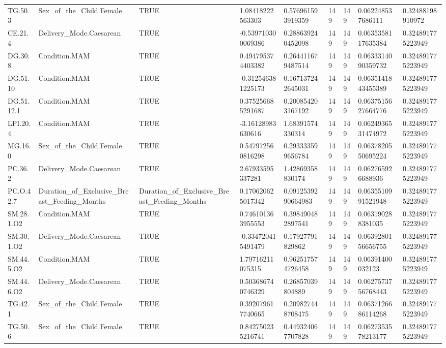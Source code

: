 \begin{longtable}{lllllllll}
TG.50.3 & Sex\_of\_the\_Child.Female & TRUE & 1.08418222563303 & 0.576961593919359 & 149 & 149 & 0.062248537686111 & 0.32488198910972 \\
CE.21.4 & Delivery\_Mode.Caesarean & TRUE & -0.539710300069386 & 0.288639240452098 & 149 & 149 & 0.0635358117635384 & 0.324891775223949 \\
DG.30.8 & Condition.MAM & TRUE & 0.494795374403382 & 0.264411679487514 & 149 & 149 & 0.0633314090359732 & 0.324891775223949 \\
DG.51.10 & Condition.MAM & TRUE & -0.312546381225173 & 0.167137242645031 & 149 & 149 & 0.0635141843455389 & 0.324891775223949 \\
DG.51.12.1 & Condition.MAM & TRUE & 0.375256685291687 & 0.200854203167192 & 149 & 149 & 0.0637515627664776 & 0.324891775223949 \\
LPI.20.4 & Condition.MAM & TRUE & -3.16128983630616 & 1.68391574330314 & 149 & 149 & 0.0624936531474972 & 0.324891775223949 \\
MG.16.0 & Sex\_of\_the\_Child.Female & TRUE & 0.547972560816298 & 0.293333599656784 & 149 & 149 & 0.0637820550695224 & 0.324891775223949 \\
PC.36.2 & Delivery\_Mode.Caesarean & TRUE & 2.67933595337281 & 1.42869358830174 & 149 & 149 & 0.062765926688936 & 0.324891775223949 \\
PC.O.42.7 & Duration\_of\_Exclusive\_Breast\_Feeding\_Months & Duration\_of\_Exclusive\_Breast\_Feeding\_Months & 0.170620625017342 & 0.0912539290664983 & 149 & 149 & 0.0635510991521948 & 0.324891775223949 \\
SM.28.1.O2 & Condition.MAM & TRUE & 0.746101363955553 & 0.398490482897541 & 149 & 149 & 0.063190288381035 & 0.324891775223949 \\
SM.30.1.O2 & Delivery\_Mode.Caesarean & TRUE & -0.334720415491479 & 0.17927791829862 & 149 & 149 & 0.0639280156656755 & 0.324891775223949 \\
SM.44.5.O2 & Condition.MAM & TRUE & 1.79716211075315 & 0.962517574726458 & 149 & 149 & 0.06391400032123 & 0.324891775223949 \\
SM.44.6.O2 & Delivery\_Mode.Caesarean & TRUE & 0.503686740746329 & 0.26857039804889 & 149 & 149 & 0.0627573756768443 & 0.324891775223949 \\
TG.42.1 & Sex\_of\_the\_Child.Female & TRUE & 0.392079617740665 & 0.209827448708475 & 149 & 149 & 0.0637126686114268 & 0.324891775223949 \\
TG.50.6 & Sex\_of\_the\_Child.Female & TRUE & 0.842750235216741 & 0.449324067707828 & 149 & 149 & 0.0627353578213177 & 0.324891775223949 \\

\end{longtable}
